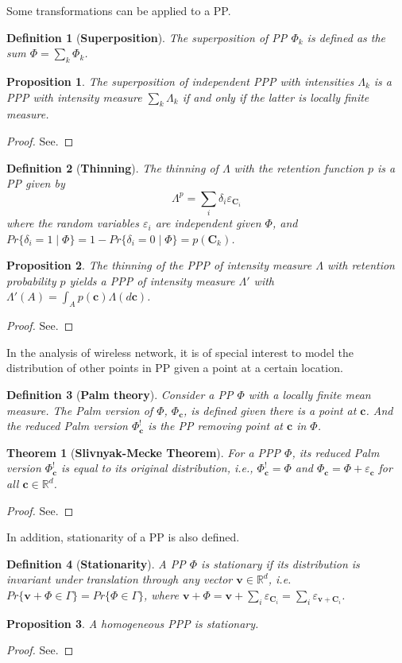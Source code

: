 \documentclass[a4paper,twocolumn]{IEEEtran}
\newtheorem{definition}{\textbf{Definition}}
\newtheorem{proposition}{\textbf{Proposition}}
\newtheorem{theorem}{\textbf{Theorem}}
\begin{document}
Some transformations can be applied to a PP.
\begin{definition}[\textbf{Superposition}]
The superposition of PP $\Phi_k$ is defined as the sum $\Phi=\sum_k \Phi_k$. 	
\end{definition}
\begin{proposition}
The superposition of independent PPP with intensities $\Lambda_k$ is a PPP with intensity measure $\sum_k \Lambda_k$ if and only if the latter is locally finite measure.
\end{proposition}	
\begin{proof}
See.
\end{proof}
\begin{definition}[\textbf{Thinning}]
The thinning of $\Lambda$ with the retention function $p$ is a PP given by
\begin{displaymath}
\Lambda^p = \sum_i \delta_i \varepsilon_{\bm{C}_i} 
\end{displaymath}
where the random variables $\varepsilon_i$ are independent given $\Phi$, and $Pr\{\delta_i=1\mid \Phi\}=1-Pr\{\delta_i=0\mid \Phi\}=p(\bm{C}_k)$.
\end{definition}
\begin{proposition}\label{prop:PPPthinning}
The thinning of the PPP of intensity measure $\Lambda$ with retention probability $p$ yields a PPP of intensity measure $\Lambda'$ with $\Lambda'(A)=\int_A p(\bm{c}) \Lambda(d\bm{c})$.
\end{proposition}
\begin{proof}
See.
\end{proof}
In the analysis of wireless network, it is of special interest to model the distribution of other points in PP given a point at a certain location.
\begin{definition}[\textbf{Palm theory}]
Consider a PP $\Phi$ with a locally finite mean measure. The Palm version of $\Phi$, $\Phi_{\bm{c}}$, is defined given there is a point at $\bm{c}$. And the reduced Palm version $\Phi_{\bm{c}}^!$ is the PP removing point at $\bm{c}$ in $\Phi$.  
\end{definition}
\begin{theorem}[\textbf{Slivnyak-Mecke Theorem}]
For a PPP $\Phi$, its reduced Palm version $\Phi_{\bm{c}}^!$ is equal to its original distribution, i.e., $\Phi_{\bm{c}}^! = \Phi$ and $\Phi_{\bm{c}} = \Phi+\varepsilon_{\bm{c}}$ for all $\bm{c}\in\mathbb{R}^d$.    
\end{theorem}
\begin{proof}
See.
\end{proof}
In addition, stationarity of a PP is also defined.
\begin{definition}[\textbf{Stationarity}]
A PP $\Phi$ is stationary if its distribution is invariant under translation through any vector $\bm{v}\in\mathbb{R}^d$, i.e. $Pr\{\bm{v}+\Phi \in \Gamma\}=Pr\{\Phi \in \Gamma\}$, where $\bm{v}+\Phi=\bm{v}+\sum_i \varepsilon_{\bm{C}_i} = \sum_i \varepsilon_{\bm{v}+\bm{C}_i}$.
\end{definition}
\begin{proposition}
A homogeneous PPP is stationary.
\end{proposition}
\begin{proof}
See.
\end{proof}
\end{document}

